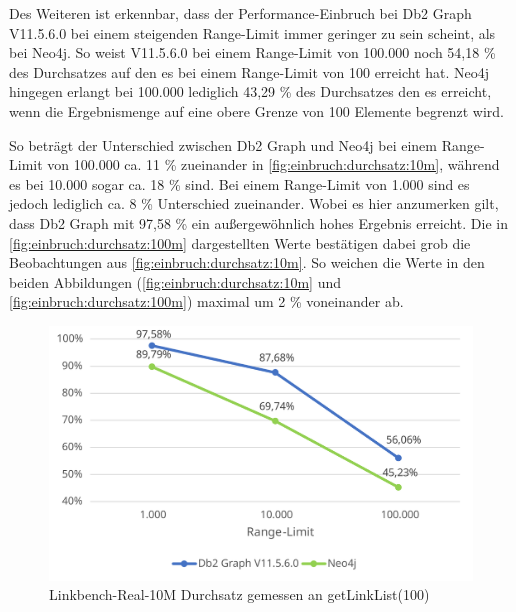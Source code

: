 Des Weiteren ist erkennbar, dass der Performance-Einbruch bei Db2 Graph V11.5.6.0 bei einem steigenden Range-Limit immer geringer zu sein scheint, als bei Neo4j. So weist V11.5.6.0 bei einem Range-Limit von 100.000 noch 54,18 \% des Durchsatzes auf den es bei einem Range-Limit von 100 erreicht hat. Neo4j hingegen erlangt bei 100.000 lediglich 43,29 \% des Durchsatzes den es erreicht, wenn die Ergebnismenge auf eine obere Grenze von 100 Elemente begrenzt wird. 

So beträgt der Unterschied zwischen Db2 Graph und Neo4j bei einem Range-Limit von 100.000 ca. 11 \% zueinander in \autoref{fig:einbruch:durchsatz:10m}, während es bei 10.000 sogar ca. 18 \% sind. Bei einem Range-Limit von 1.000 sind es jedoch lediglich ca. 8 \% Unterschied zueinander. Wobei es hier anzumerken gilt, dass Db2 Graph mit 97,58 \% ein außergewöhnlich hohes Ergebnis erreicht. Die in \autoref{fig:einbruch:durchsatz:100m} dargestellten Werte bestätigen dabei grob die Beobachtungen aus \autoref{fig:einbruch:durchsatz:10m}. So weichen die Werte in den beiden Abbildungen (\autoref{fig:einbruch:durchsatz:10m} und \ref{fig:einbruch:durchsatz:100m}) maximal um 2 \% voneinander ab. 

\begin{figure}[!ht]
    \centering
    \includegraphics[width=\textwidth]{images/diagramme/limit_relative_durchsatz_real_10m.pdf}
    \caption{Linkbench-Real-10M Durchsatz gemessen an getLinkList(100)}
    \label{fig:einbruch:durchsatz:10m}
\end{figure}

